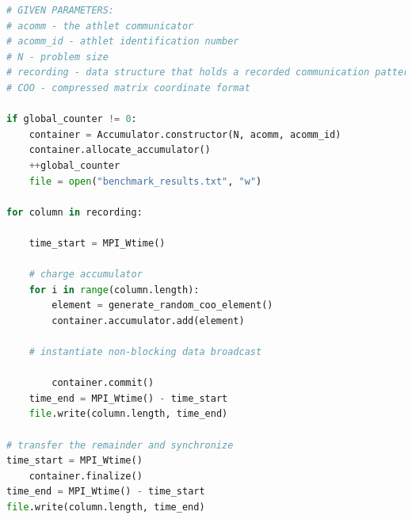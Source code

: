 \begin{minipage}{\linewidth}
\begin{lstlisting}[language=python, caption={Pseudocode of a modified client side of the benchmark}, frame=single, label={lst:beanch:pseudocode}]
# GIVEN PARAMETERS:
# acomm - the athlet communicator
# acomm_id - athlet identification number 
# N - problem size
# recording - data structure that holds a recorded communication pattern
# COO - compressed matrix coordinate format

if global_counter != 0:
	container = Accumulator.constructor(N, acomm, acomm_id)
	container.allocate_accumulator()
	++global_counter
	file = open("benchmark_results.txt", "w")

for column in recording:

	time_start = MPI_Wtime()
	
	# charge accumulator
	for i in range(column.length):
		element = generate_random_coo_element()		
		container.accumulator.add(element)

	# instantiate non-blocking data broadcast
	
		container.commit()
	time_end = MPI_Wtime() - time_start
	file.write(column.length, time_end)
	
# transfer the remainder and synchronize
time_start = MPI_Wtime()
	container.finalize()
time_end = MPI_Wtime() - time_start
file.write(column.length, time_end)


\end{lstlisting}
\end{minipage}


